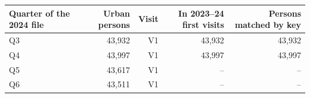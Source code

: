 \begin{tabular}{lrrrr}
\toprule
Quarter of the 2024 file & Urban persons & Visit & In 2023--24 first visits & Persons matched by key \\
\midrule
Q3 & 43,932 & V1 & 43,932 & 43,932 \\
Q4 & 43,997 & V1 & 43,997 & 43,997 \\
Q5 & 43,617 & V1 & -- & -- \\
Q6 & 43,511 & V1 & -- & -- \\
\bottomrule
\end{tabular}
